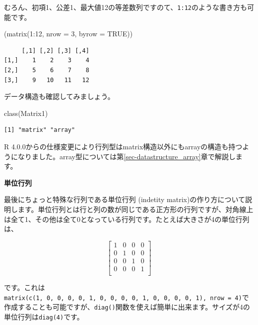 \documentclass[
  a4paper,
  pandoc,
  ja=standard,
  jafont=haranoaji]{bxjsbook}
\newenvironment{Shaded}{\begin{snugshade}}{\end{snugshade}}
\newcommand{\AttributeTok}[1]{\textcolor[rgb]{0.00,0.48,0.65}{#1}}
\newcommand{\ConstantTok}[1]{\textcolor[rgb]{0.56,0.35,0.01}{#1}}
\newcommand{\DecValTok}[1]{\textcolor[rgb]{0.68,0.00,0.00}{#1}}
\newcommand{\FunctionTok}[1]{\textcolor[rgb]{0.28,0.35,0.67}{#1}}
\newcommand{\NormalTok}[1]{\textcolor[rgb]{0.00,0.48,0.65}{#1}}
\newcommand{\SpecialCharTok}[1]{\textcolor[rgb]{0.37,0.37,0.37}{#1}}
\begin{document}
むろん、初項1、公差1、最大値12の等差数列ですのて、\texttt{1:12}のような書き方も可能です。

\begin{Shaded}
\begin{Highlighting}[numbers=left,,]
\NormalTok{(}\FunctionTok{matrix}\NormalTok{(}\DecValTok{1}\SpecialCharTok{:}\DecValTok{12}\NormalTok{, }\AttributeTok{nrow =} \DecValTok{3}\NormalTok{, }\AttributeTok{byrow =} \ConstantTok{TRUE}\NormalTok{))}
\end{Highlighting}
\end{Shaded}

\begin{verbatim}
     [,1] [,2] [,3] [,4]
[1,]    1    2    3    4
[2,]    5    6    7    8
[3,]    9   10   11   12
\end{verbatim}

データ構造も確認してみましょう。

\begin{Shaded}
\begin{Highlighting}[numbers=left,,]
\FunctionTok{class}\NormalTok{(Matrix1)}
\end{Highlighting}
\end{Shaded}

\begin{verbatim}
[1] "matrix" "array" 
\end{verbatim}

R
4.0.0からの仕様変更により行列型はmatrix構造以外にもarrayの構造も持つようになりました。array型については第\ref{sec-datastructure_array}章で解説します。

\textbf{単位行列}

最後にちょっと特殊な行列である単位行列 (indetity
matrix)の作り方について説明します。単位行列とは行と列の数が同じである正方形の行列ですが、対角線上は全て1、その他は全て0となっている行列です。たとえば大きさが4の単位行列は、

\[
\left[
\begin{matrix} 
1 & 0 & 0 & 0 \\ 
0 & 1 & 0 & 0 \\ 
0 & 0 & 1 & 0 \\ 
0 & 0 & 0 & 1 \\ 
\end{matrix}
\right]
\]

です。これは\texttt{matrix(c(1,\ 0,\ 0,\ 0,\ 0,\ 1,\ 0,\ 0,\ 0,\ 0,\ 1,\ 0,\ 0,\ 0,\ 0,\ 1),\ nrow\ =\ 4)}で作成することも可能ですが、\texttt{diag()}関数を使えば簡単に出来ます。サイズが4の単位行列は\texttt{diag(4)}です。
\end{document}
